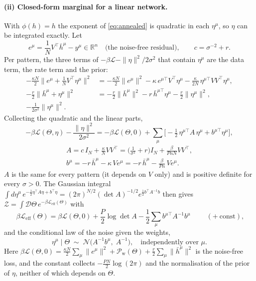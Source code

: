 \documentclass[11pt,a4paper]{article}
\newcommand{\R}{\mathbb R}
\newcommand{\D}{\mathcal D}
\newcommand{\Lc}{\mathcal L}
\newcommand{\Leff}{\mathcal L_{\mathrm{eff}}}
\newcommand{\Z}{\mathcal Z}
\newcommand{\Pw}{\mathcal P_{\mathrm w}}
\newcommand{\hb}{\bar h}
\theoremstyle{remark}
\begin{document}
\paragraph{(ii) Closed-form marginal for a linear network.}
With $\phi(h) = h$ the exponent of \eqref{eq:annealed} is quadratic in each
$\eta^\mu$, so $\eta$ can be integrated exactly. Let
\begin{equation}
  e^\mu = \frac1N V^\top\hb^\mu - y^\mu\in\R^n
  \quad\text{(the noise-free residual)},\qquad
  c = \sigma^{-2} + r .
\end{equation}
Per pattern, the three terms of $-\beta\Lc - \|\eta\|^2/2\sigma^2$ that
contain $\eta^\mu$ are the data term, the rate term and the prior:
\begin{align}
  -\frac{\kappa N}{2}\Big\|e^\mu + \frac1N V^\top\eta^\mu\Big\|^2
  &= -\frac{\kappa N}{2}\|e^\mu\|^2
     - \kappa\,e^{\mu\top}V^\top\eta^\mu
     - \frac{\kappa}{2N}\,\eta^{\mu\top}VV^\top\eta^\mu ,
  \nonumber\\
  -\frac r2\|\hb^\mu + \eta^\mu\|^2
  &= -\frac r2\|\hb^\mu\|^2 - r\,\hb^{\mu\top}\eta^\mu - \frac r2\|\eta^\mu\|^2 ,
  \label{eq:expand}\\
  -\frac{1}{2\sigma^2}\|\eta^\mu\|^2 . &
  \nonumber
\end{align}
Collecting the quadratic and the linear parts,
\begin{equation}
  -\beta\Lc(\Theta,\eta) - \frac{\|\eta\|^2}{2\sigma^2}
  = -\beta\Lc(\Theta,0)
    + \sum_\mu\Big[-\tfrac12\,\eta^{\mu\top}A\,\eta^\mu + b^{\mu\top}\eta^\mu\Big],
\end{equation}
\begin{equation}
  \boxed{\;
  \begin{gathered}
  A = c\,I_N + \frac{\kappa}{N}VV^\top = \Big(\frac1{\sigma^2} + r\Big)I_N + \frac{\beta}{PnN}VV^\top,\\
  b^\mu = -r\,\hb^\mu - \kappa\,Ve^\mu = -r\,\hb^\mu - \frac{\beta}{Pn}\,Ve^\mu .
  \end{gathered}
  \;}
  \label{eq:Ab}
\end{equation}
$A$ is the same for every pattern (it depends on $V$ only) and is positive
definite for every $\sigma > 0$. The Gaussian integral
$\int d\eta^\mu\,e^{-\frac12\eta^\top A\eta + b^\top\eta} = (2\pi)^{N/2}(\det A)^{-1/2}e^{\frac12 b^\top A^{-1}b}$
then gives $\Z = \int\D\Theta\,e^{-\beta\Leff(\Theta)}$ with
\begin{equation}
  \boxed{\;
  \beta\Leff(\Theta) = \beta\Lc(\Theta,0) + \frac P2\log\det A
  - \frac12\sum_\mu b^{\mu\top}A^{-1}b^\mu
  \;}\qquad(+\ \text{const}),
  \label{eq:Leff}
\end{equation}
and the conditional law of the noise given the weights,
\begin{equation}
  \eta^\mu\mid\Theta\;\sim\;\mathcal N\big(A^{-1}b^\mu,\;A^{-1}\big),
  \quad\text{independently over }\mu .
  \label{eq:eta-cond}
\end{equation}
Here $\beta\Lc(\Theta,0) = \frac{\kappa N}{2}\sum_\mu\|e^\mu\|^2 + \Pw(\Theta) + \frac r2\sum_\mu\|\hb^\mu\|^2$
is the noise-free loss, and the constant collects
$-\frac{PN}{2}\log(2\pi)$ and the normalisation of the prior of $\eta$,
neither of which depends on $\Theta$.
\end{document}
